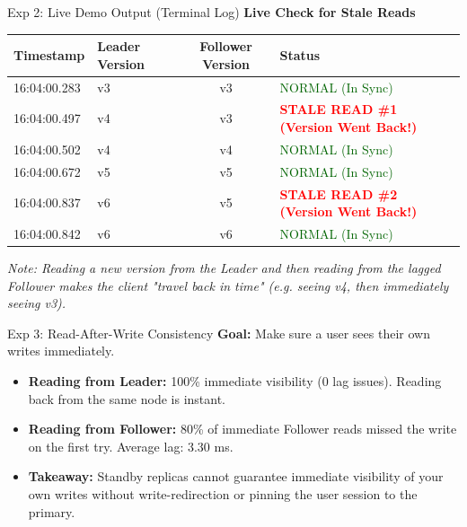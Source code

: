 \documentclass[aspectratio=169]{beamer}
\begin{document}
\begin{frame}{Exp 2: Live Demo Output (Terminal Log)}
    \textbf{Live Check for Stale Reads}
    \vspace{0.2cm}
    \begin{table}[]
        \centering
        \small
        \begin{tabular}{@{}llcl@{}}
            \toprule
            \textbf{Timestamp} & \textbf{Leader Version} & \textbf{Follower Version} & \textbf{Status} \\ \midrule
            16:04:00.283 & v3 & v3 & \textcolor{darkgreen}{NORMAL (In Sync)} \\ 
            16:04:00.497 & v4 & v3 & \textcolor{red}{\textbf{STALE READ \#1 (Version Went Back!)}} \\ 
            16:04:00.502 & v4 & v4 & \textcolor{darkgreen}{NORMAL (In Sync)} \\ \midrule
            16:04:00.672 & v5 & v5 & \textcolor{darkgreen}{NORMAL (In Sync)} \\ 
            16:04:00.837 & v6 & v5 & \textcolor{red}{\textbf{STALE READ \#2 (Version Went Back!)}} \\ 
            16:04:00.842 & v6 & v6 & \textcolor{darkgreen}{NORMAL (In Sync)} \\ \bottomrule
        \end{tabular}
    \end{table}
    \vspace{0.1cm}
    \small \textit{Note: Reading a new version from the Leader and then reading from the lagged Follower makes the client "travel back in time" (e.g. seeing v4, then immediately seeing v3).}
\end{frame}

\begin{frame}{Exp 3: Read-After-Write Consistency}
    \textbf{Goal:} Make sure a user sees their own writes immediately.
    \begin{itemize}
        \item \textbf{Reading from Leader:} 100\% immediate visibility (0 lag issues). Reading back from the same node is instant.
        \item \textbf{Reading from Follower:} 80\% of immediate Follower reads missed the write on the first try. Average lag: 3.30 ms.
        \item \textbf{Takeaway:} Standby replicas cannot guarantee immediate visibility of your own writes without write-redirection or pinning the user session to the primary.
    \end{itemize}
\end{frame}
\end{document}
